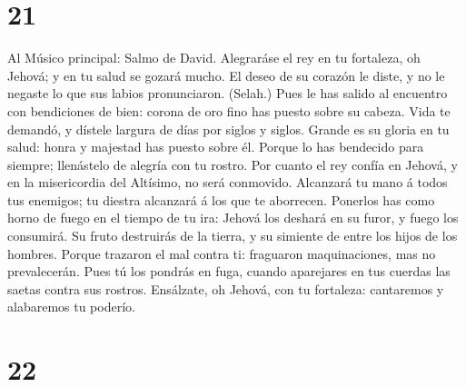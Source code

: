 \hypertarget{section-20}{%
\section{21}\label{section-20}}

 Al Músico principal: Salmo de David. Alegraráse el rey en
tu fortaleza, oh Jehová; y en tu salud se gozará mucho. 
El deseo de su corazón le diste, y no le negaste lo que sus labios
pronunciaron. (Selah.)  Pues le has salido al encuentro
con bendiciones de bien: corona de oro fino has puesto sobre su cabeza.
 Vida te demandó, y dístele largura de días por siglos y
siglos.  Grande es su gloria en tu salud: honra y majestad
has puesto sobre él.  Porque lo has bendecido para
siempre; llenástelo de alegría con tu rostro.  Por cuanto
el rey confía en Jehová, y en la misericordia del Altísimo, no será
conmovido.  Alcanzará tu mano á todos tus enemigos; tu
diestra alcanzará á los que te aborrecen.  Ponerlos has
como horno de fuego en el tiempo de tu ira: Jehová los deshará en su
furor, y fuego los consumirá.  Su fruto destruirás de la
tierra, y su simiente de entre los hijos de los hombres. 
Porque trazaron el mal contra ti: fraguaron maquinaciones, mas no
prevalecerán.  Pues tú los pondrás en fuga, cuando
aparejares en tus cuerdas las saetas contra sus rostros. 
Ensálzate, oh Jehová, con tu fortaleza: cantaremos y alabaremos tu
poderío.

\hypertarget{section-21}{%
\section{22}\label{section-21}}

